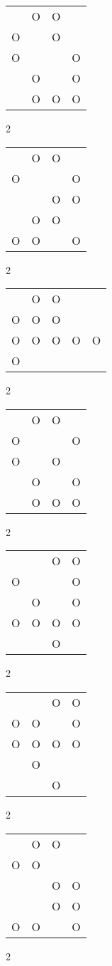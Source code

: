 \begin{tabular}{|m{0.2cm}m{0.2cm}m{0.2cm}m{0.2cm}|}\hline
 &O&O& \\
O& &O& \\
O& & &O\\
 &O& &O\\
 &O&O&O\\
\hline\end{tabular}2
\begin{tabular}{|m{0.2cm}m{0.2cm}m{0.2cm}m{0.2cm}|}\hline
 &O&O& \\
O& & &O\\
 & &O&O\\
 &O&O& \\
O&O& &O\\
\hline\end{tabular}2
\begin{tabular}{|m{0.2cm}m{0.2cm}m{0.2cm}m{0.2cm}m{0.2cm}|}\hline
 &O&O& & \\
O&O&O& & \\
O&O&O&O&O\\
O& & & & \\
\hline\end{tabular}2
\begin{tabular}{|m{0.2cm}m{0.2cm}m{0.2cm}m{0.2cm}|}\hline
 &O&O& \\
O& & &O\\
O& &O& \\
 &O& &O\\
 &O&O&O\\
\hline\end{tabular}2
\begin{tabular}{|m{0.2cm}m{0.2cm}m{0.2cm}m{0.2cm}|}\hline
 & &O&O\\
O& & &O\\
 &O& &O\\
O&O&O&O\\
 & &O& \\
\hline\end{tabular}2
\begin{tabular}{|m{0.2cm}m{0.2cm}m{0.2cm}m{0.2cm}|}\hline
 & &O&O\\
O&O& &O\\
O&O&O&O\\
 &O& & \\
 & &O& \\
\hline\end{tabular}2
\begin{tabular}{|m{0.2cm}m{0.2cm}m{0.2cm}m{0.2cm}|}\hline
 &O&O& \\
O&O& & \\
 & &O&O\\
 & &O&O\\
O&O& &O\\
\hline\end{tabular}2
